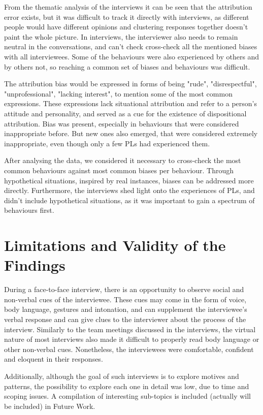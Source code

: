 From the thematic analysis of the interviews it can be seen that the attribution error exists, but it was difficult to track it directly with interviews, as different people would have different opinions and clustering responses together doesn't paint the whole picture. In interviews, the interviewer also needs to remain neutral in the conversations, and can't check cross-check all the mentioned biases with all interviewees. Some of the behaviours were also experienced by others and by others not, so reaching a common set of biases and behaviours was difficult. 

The attribution bias would be expressed in forms of being "rude", "disrespectful", "unprofessional", "lacking interest", to mention some of the most common expressions. These expressions lack situational attribution and refer to a person's attitude and personality, and served as a cue for the existence of dispositional attribution. Bias was present, especially in behaviours that were considered inappropriate before. But new ones also emerged, that were considered extremely inappropriate, even though only a few PLs had experienced them. 

After analysing the data, we considered it necessary to cross-check the most common behaviours against most common biases per behaviour. Through hypothetical situations, inspired by real instances, biases can be addressed more directly. Furthermore, the interviews shed light onto the experiences of PLs, and didn't include hypothetical situations, as it was important to gain a spectrum of behaviours first.

\section{Limitations and Validity of the Findings}\label{Limitations}

During a face-to-face interview, there is an opportunity to observe social and non-verbal cues of the interviewee. These cues may come in the form of voice, body language, gestures and intonation, and can supplement the interviewee’s verbal response and can give clues to the interviewer about the process of the interview. Similarly to the team meetings discussed in the interviews, the virtual nature of most interviews also made it difficult to properly read body language or other non-verbal cues. Nonetheless, the interviewees were comfortable, confident and eloquent in their responses. 

Additionally, although the goal of such interviews is to explore motives and patterns, the possibility to explore each one in detail was low, due to time and scoping issues. A compilation of interesting sub-topics is included (actually will be included) in Future Work.

